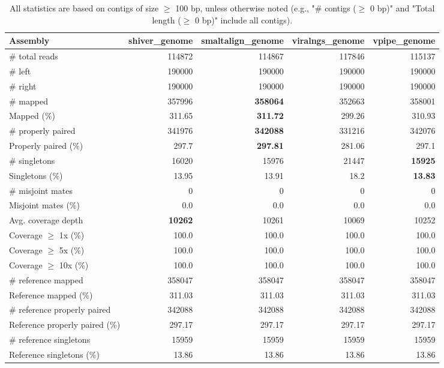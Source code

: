 \documentclass[12pt,a4paper]{article}
\begin{document}
\begin{table}[ht]
\begin{center}
\caption{All statistics are based on contigs of size $\geq$ 100 bp, unless otherwise noted (e.g., "\# contigs ($\geq$ 0 bp)" and "Total length ($\geq$ 0 bp)" include all contigs).}
\begin{tabular}{|l*{4}{|r}|}
\hline
Assembly & shiver\_genome & smaltalign\_genome & viralngs\_genome & vpipe\_genome \\ \hline
\# total reads & 114872 & 114867 & 117846 & 115137 \\ \hline
\# left & 190000 & 190000 & 190000 & 190000 \\ \hline
\# right & 190000 & 190000 & 190000 & 190000 \\ \hline
\# mapped & 357996 & {\bf 358064} & 352663 & 358001 \\ \hline
Mapped (\%) & 311.65 & {\bf 311.72} & 299.26 & 310.93 \\ \hline
\# properly paired & 341976 & {\bf 342088} & 331216 & 342076 \\ \hline
Properly paired (\%) & 297.7 & {\bf 297.81} & 281.06 & 297.1 \\ \hline
\# singletons & 16020 & 15976 & 21447 & {\bf 15925} \\ \hline
Singletons (\%) & 13.95 & 13.91 & 18.2 & {\bf 13.83} \\ \hline
\# misjoint mates & 0 & 0 & 0 & 0 \\ \hline
Misjoint mates (\%) & 0.0 & 0.0 & 0.0 & 0.0 \\ \hline
Avg. coverage depth & {\bf 10262} & 10261 & 10069 & 10252 \\ \hline
Coverage $\geq$ 1x (\%) & 100.0 & 100.0 & 100.0 & 100.0 \\ \hline
Coverage $\geq$ 5x (\%) & 100.0 & 100.0 & 100.0 & 100.0 \\ \hline
Coverage $\geq$ 10x (\%) & 100.0 & 100.0 & 100.0 & 100.0 \\ \hline
\# reference mapped & 358047 & 358047 & 358047 & 358047 \\ \hline
Reference mapped (\%) & 311.03 & 311.03 & 311.03 & 311.03 \\ \hline
\# reference properly paired & 342088 & 342088 & 342088 & 342088 \\ \hline
Reference properly paired (\%) & 297.17 & 297.17 & 297.17 & 297.17 \\ \hline
\# reference singletons & 15959 & 15959 & 15959 & 15959 \\ \hline
Reference singletons (\%) & 13.86 & 13.86 & 13.86 & 13.86 \\ \hline

\end{tabular}
\end{center}
\end{table}
\end{document}
